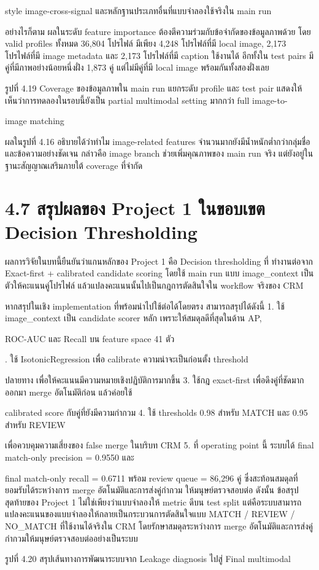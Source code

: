 \documentclass[12pt,a4paper]{report}
\begin{document}
style image-cross-signal และหลักฐานประเภทอื่นที่แบบจำลองใช้จริงใน main run\par
อย่างไรก็ตาม ผลในระดับ feature importance ต้องตีความร่วมกับข้อจำกัดของข้อมูลภาพด้วย โดย valid profiles ทั้งหมด 36,804 โปรไฟล์ มีเพียง 4,248 โปรไฟล์ที่มี local image, 2,173 โปรไฟล์ที่มี image metadata และ 2,173 โปรไฟล์ที่มี caption ใช้งานได้ อีกทั้งใน test pairs มีคู่ที่มีภาพอย่างน้อยหนึ่งฝั่ง 1,873 คู่ แต่ไม่มีคู่ที่มี local image พร้อมกันทั้งสองฝั่งเลย\par
\begin{center}\small รูปที่ 4.19 Coverage ของข้อมูลภาพใน main run แยกระดับ profile และ test pair แสดงให้เห็นว่าการทดลองในรอบนี้ยังเป็น partial multimodal setting มากกว่า full image-to-\end{center}
image matching\par
ผลในรูปที่ 4.16 อธิบายได้ว่าทำไม image-related features จำนวนมากยังมีน้ำหนักต่ำกว่ากลุ่มชื่อและข้อความอย่างชัดเจน กล่าวคือ image branch ช่วยเพิ่มคุณภาพของ main run จริง แต่ยังอยู่ในฐานะสัญญาณเสริมภายใต้ coverage ที่จำกัด\par
\section*{4.7 สรุปผลของ Project 1 ในขอบเขต Decision Thresholding}
ผลการวิจัยในบทนี้ยืนยันว่าแกนหลักของ Project 1 คือ Decision thresholding ที่ ทำงานต่อจาก Exact-first + calibrated candidate scoring โดยใช้ main run แบบ image\_context เป็นตัวให้คะแนนคู่โปรไฟล์ แล้วแปลงคะแนนนั้นไปเป็นกฎการตัดสินใจใน workflow จริงของ CRM\par
หากสรุปในเชิง implementation ที่พร้อมนำไปใช้ต่อได้โดยตรง สามารถสรุปได้ดังนี้ 1. ใช้ image\_context เป็น candidate scorer หลัก เพราะให้สมดุลดีที่สุดในด้าน AP,\par
ROC-AUC และ Recall บน feature space 41 ตัว\par
\clearpage
{}. ใช้ IsotonicRegression เพื่อ calibrate ความน่าจะเป็นก่อนตั้ง threshold\par
ปลายทาง เพื่อให้คะแนนมีความหมายเชิงปฏิบัติการมากขึ้น 3. ใช้กฎ exact-first เพื่อดึงคู่ที่ชัดมากออกมา merge อัตโนมัติก่อน แล้วค่อยใช้\par
calibrated score กับคู่ที่ยังมีความกำกวม 4. ใช้ thresholds 0.98 สำหรับ MATCH และ 0.95 สำหรับ REVIEW\par
เพื่อควบคุมความเสี่ยงของ false merge ในบริบท CRM 5. ที่ operating point นี้ ระบบได้ final match-only precision = 0.9550 และ\par
final match-only recall = 0.6711 พร้อม review queue = 86,296 คู่ ซึ่งสะท้อนสมดุลที่ยอมรับได้ระหว่างการ merge อัตโนมัติและการส่งคู่กำกวม ให้มนุษย์ตรวจสอบต่อ ดังนั้น ข้อสรุปสุดท้ายของ Project 1 ไม่ใช่เพียงว่าแบบจำลองให้ metric ดีบน test split แต่คือระบบสามารถแปลงคะแนนของแบบจำลองให้กลายเป็นกระบวนการตัดสินใจแบบ MATCH / REVIEW / NO\_MATCH ที่ใช้งานได้จริงใน CRM โดยรักษาสมดุลระหว่างการ merge อัตโนมัติและการส่งคู่กำกวมให้มนุษย์ตรวจสอบต่ออย่างเป็นระบบ\par
\begin{center}\small รูปที่ 4.20 สรุปเส้นทางการพัฒนาระบบจาก Leakage diagnosis ไปสู่ Final multimodal\end{center}
\end{document}
